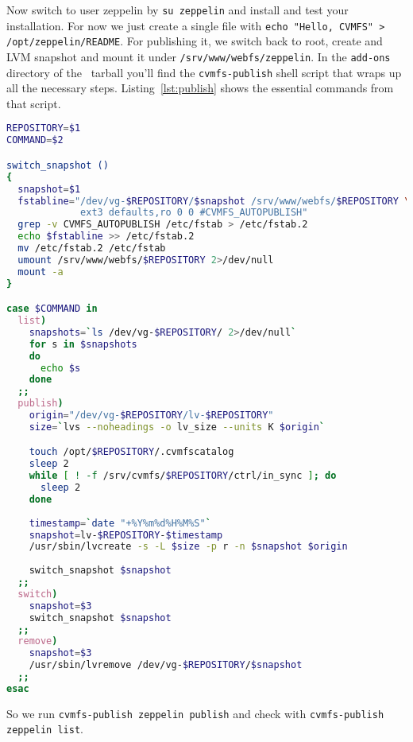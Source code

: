 Now switch to user zeppelin by \lstinline{su zeppelin} and install and test your installation.
For now we just create a single file with \lstinline{echo "Hello, CVMFS" > /opt/zeppelin/README}.
For publishing it, we switch back to root, create and LVM snapshot and mount it under \texttt{/srv/www/webfs/zeppelin}.
In the \texttt{add-ons} directory of the \cvmfs\ tarball you'll find the \texttt{cvmfs-publish} shell script that wraps up all the necessary steps.
Listing~\ref{lst:publish} shows the essential commands from that script.
\begin{lstlisting}[caption=Excerpt from \texttt{cvmfs-publish} utility,label=lst:publish,language=bash]
REPOSITORY=$1
COMMAND=$2

switch_snapshot ()
{
  snapshot=$1
  fstabline="/dev/vg-$REPOSITORY/$snapshot /srv/www/webfs/$REPOSITORY \
             ext3 defaults,ro 0 0 #CVMFS_AUTOPUBLISH"
  grep -v CVMFS_AUTOPUBLISH /etc/fstab > /etc/fstab.2
  echo $fstabline >> /etc/fstab.2
  mv /etc/fstab.2 /etc/fstab
  umount /srv/www/webfs/$REPOSITORY 2>/dev/null
  mount -a
}

case $COMMAND in
  list)
    snapshots=`ls /dev/vg-$REPOSITORY/ 2>/dev/null`
    for s in $snapshots
    do
      echo $s
    done    
  ;;
  publish)
    origin="/dev/vg-$REPOSITORY/lv-$REPOSITORY"
    size=`lvs --noheadings -o lv_size --units K $origin`

    touch /opt/$REPOSITORY/.cvmfscatalog 
    sleep 2
    while [ ! -f /srv/cvmfs/$REPOSITORY/ctrl/in_sync ]; do
      sleep 2
    done
    
    timestamp=`date "+%Y%m%d%H%M%S"`
    snapshot=lv-$REPOSITORY-$timestamp
    /usr/sbin/lvcreate -s -L $size -p r -n $snapshot $origin
    
    switch_snapshot $snapshot
  ;;
  switch)
    snapshot=$3
    switch_snapshot $snapshot
  ;;
  remove)
    snapshot=$3
    /usr/sbin/lvremove /dev/vg-$REPOSITORY/$snapshot
  ;;
esac
\end{lstlisting}
So we run \lstinline{cvmfs-publish zeppelin publish} and check with \lstinline{cvmfs-publish zeppelin list}.

